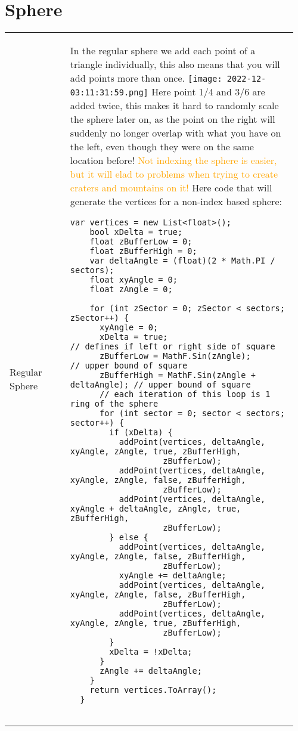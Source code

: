 \documentclass[main.tex,fontsize=8pt,paper=a4,paper=portrait,DIV=calc,]{scrartcl}
\begin{document}
\pagebreak 
\begin{table}[ht!]
\section{Sphere}
\begin{tabular}{|m{0.2\linewidth}|m{0.755\linewidth}|}
\hline
Regular Sphere & 
In the regular sphere we add each point of a triangle individually, this also means that you will add points more than once.\newline
\texttt{[image: 2022-12-03:11:31:59.png]}\newline
Here point 1/4 and 3/6 are added twice, this makes it hard to randomly scale the sphere later on, as the point on the right will suddenly no longer overlap with what you have on the left, even though they were on the same location before!\newline
\textcolor{orange}{Not indexing the sphere is easier, but it will elad to problems when trying to create craters and mountains on it!}\newline
Here code that will generate the vertices for a non-index based sphere:\newline
\begin{lstlisting}
var vertices = new List<float>();
    bool xDelta = true;
    float zBufferLow = 0;
    float zBufferHigh = 0;
    var deltaAngle = (float)(2 * Math.PI / sectors);
    float xyAngle = 0;
    float zAngle = 0;

    for (int zSector = 0; zSector < sectors; zSector++) {
      xyAngle = 0;
      xDelta = true;                                // defines if left or right side of square
      zBufferLow = MathF.Sin(zAngle);               // upper bound of square
      zBufferHigh = MathF.Sin(zAngle + deltaAngle); // upper bound of square
      // each iteration of this loop is 1 ring of the sphere
      for (int sector = 0; sector < sectors; sector++) {
        if (xDelta) {
          addPoint(vertices, deltaAngle, xyAngle, zAngle, true, zBufferHigh,
                   zBufferLow);
          addPoint(vertices, deltaAngle, xyAngle, zAngle, false, zBufferHigh,
                   zBufferLow);
          addPoint(vertices, deltaAngle, xyAngle + deltaAngle, zAngle, true, zBufferHigh,
                   zBufferLow);
        } else {
          addPoint(vertices, deltaAngle, xyAngle, zAngle, false, zBufferHigh,
                   zBufferLow);
          xyAngle += deltaAngle;
          addPoint(vertices, deltaAngle, xyAngle, zAngle, false, zBufferHigh,
                   zBufferLow);
          addPoint(vertices, deltaAngle, xyAngle, zAngle, true, zBufferHigh,
                   zBufferLow);
        }
        xDelta = !xDelta;
      }
      zAngle += deltaAngle;
    }
    return vertices.ToArray();
  }


\end{lstlisting}
\end{tabular}
\end{table}
\end{document}
